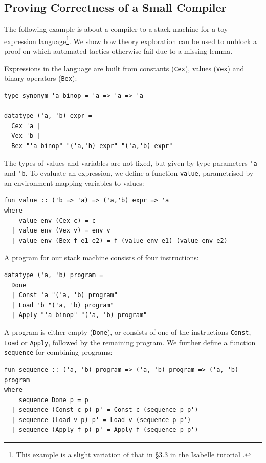 \subsection{Proving Correctness of a Small Compiler}
\label{sec:comp-ex}
The following example is about a compiler to a stack machine for a toy
expression language\footnote{This example is a slight variation of that in \S3.3 in the Isabelle tutorial \cite{isabelle}. }. We show how theory exploration can be used to unblock a proof on which automated tactics otherwise fail due to a missing lemma.

Expressions in the language are built from constants (\texttt{Cex}), values (\texttt{Vex}) and binary operators (\texttt{Bex}): 
\begin{small}
\begin{verbatim}
type_synonym 'a binop = 'a => 'a => 'a

datatype ('a, 'b) expr =
  Cex 'a |
  Vex 'b |
  Bex "'a binop" "('a,'b) expr" "('a,'b) expr"
\end{verbatim}
\end{small}
The types of values and variables are not fixed, but given by type parameters \texttt{'a} and \texttt{'b}.
To evaluate an expression, we define a function \texttt{value}, parametrised by an environment mapping variables to values:
\begin{small}
\begin{verbatim}
fun value :: ('b => 'a) => ('a,'b) expr => 'a
where
    value env (Cex c) = c 
  | value env (Vex v) = env v
  | value env (Bex f e1 e2) = f (value env e1) (value env e2)
\end{verbatim}
\end{small}
A program for our stack machine consists of four instructions:
\begin{small}
\begin{verbatim}
datatype ('a, 'b) program =
  Done
  | Const 'a "('a, 'b) program"
  | Load 'b "('a, 'b) program"
  | Apply "'a binop" "('a, 'b) program"
\end{verbatim}
\end{small}
A program is either empty (\texttt{Done}), or consists of one of the instructions \texttt{Const}, \texttt{Load} or \texttt{Apply}, followed by the remaining program. We further define a function \texttt{sequence} for combining programs:
\begin{small}
\begin{verbatim}
fun sequence :: ('a, 'b) program => ('a, 'b) program => ('a, 'b) program
where
    sequence Done p = p
  | sequence (Const c p) p' = Const c (sequence p p')
  | sequence (Load v p) p' = Load v (sequence p p')
  | sequence (Apply f p) p' = Apply f (sequence p p') 
\end{verbatim}
\end{small}
